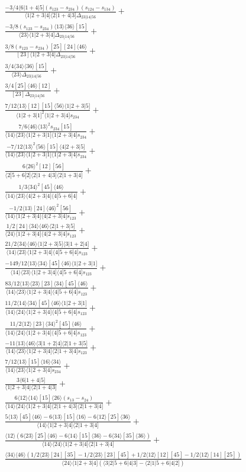 \documentclass[varwidth, border=5pt]{standalone}
\begin{document}
\begin{my}
$\begin{gathered}
\scriptscriptstyle\frac{-3/4⟨6|1+4|5](s_{123}-s_{234})(s_{124}-s_{134})}{⟨1|2+3|4]⟨2|1+4|3]Δ_{23|14|56}}+\\
\scriptscriptstyle\frac{-3/8(s_{123}-s_{234})⟨13⟩⟨36⟩[15]}{⟨23⟩⟨1|2+3|4]Δ_{23|14|56}}+\\
\scriptscriptstyle\frac{3/8(s_{123}-s_{234})[25][24]⟨46⟩}{[23]⟨1|2+3|4]Δ_{23|14|56}}+\\
\scriptscriptstyle\frac{3/4⟨34⟩⟨36⟩[15]}{⟨23⟩Δ_{23|14|56}}+\\
\scriptscriptstyle\frac{3/4[25]⟨46⟩[12]}{[23]Δ_{23|14|56}}+\\
\scriptscriptstyle\frac{7/12⟨13⟩[12][15]⟨56⟩⟨1|2+3|5]}{⟨1|2+3|1]^2⟨1|2+3|4]s_{234}}+\\
\scriptscriptstyle\frac{7/6⟨46⟩⟨13⟩^2s_{234}[15]}{⟨14⟩⟨23⟩⟨1|2+3|1]⟨1|2+3|4]s_{234}}+\\
\scriptscriptstyle\frac{-7/12⟨13⟩^2⟨56⟩[15]⟨4|2+3|5]}{⟨14⟩⟨23⟩⟨1|2+3|1]⟨1|2+3|4]s_{234}}+\\
\scriptscriptstyle\frac{6⟨26⟩^2[12][56]}{⟨2|5+6|2]⟨2|1+4|3]⟨2|1+3|4]}+\\
\scriptscriptstyle\frac{1/3⟨34⟩^2[45]⟨46⟩}{⟨14⟩⟨23⟩⟨4|2+3|4]⟨4|5+6|4]}+\\
\scriptscriptstyle\frac{-1/2⟨13⟩[24]⟨46⟩^2[56]}{⟨14⟩⟨1|2+3|4]⟨4|2+3|4]s_{123}}+\\
\scriptscriptstyle\frac{1/2[24]⟨34⟩⟨46⟩⟨2|1+3|5]}{⟨24⟩⟨1|2+3|4]⟨4|2+3|4]s_{123}}+\\
\scriptscriptstyle\frac{21/2⟨34⟩⟨46⟩⟨1|2+3|5]⟨3|1+2|4]}{⟨14⟩⟨23⟩⟨1|2+3|4]⟨4|5+6|4]s_{123}}+\\
\scriptscriptstyle\frac{-149/12⟨13⟩⟨34⟩[45]⟨46⟩⟨1|2+3|1]}{⟨14⟩⟨23⟩⟨1|2+3|4]⟨4|5+6|4]s_{123}}+\\
\scriptscriptstyle\frac{83/12⟨13⟩⟨23⟩[23]⟨34⟩[45]⟨46⟩}{⟨14⟩⟨23⟩⟨1|2+3|4]⟨4|5+6|4]s_{123}}+\\
\scriptscriptstyle\frac{11/2⟨14⟩⟨34⟩[45]⟨46⟩⟨1|2+3|1]}{⟨14⟩⟨24⟩⟨1|2+3|4]⟨4|5+6|4]s_{123}}+\\
\scriptscriptstyle\frac{11/2⟨12⟩[23]⟨34⟩^2[45]⟨46⟩}{⟨14⟩⟨24⟩⟨1|2+3|4]⟨4|5+6|4]s_{123}}+\\
\scriptscriptstyle\frac{-11⟨13⟩⟨46⟩⟨3|1+2|4]⟨2|1+3|5]}{⟨14⟩⟨23⟩⟨1|2+3|4]⟨2|1+3|4]s_{123}}+\\
\scriptscriptstyle\frac{7/12⟨13⟩[15]⟨16⟩⟨34⟩}{⟨14⟩⟨23⟩⟨1|2+3|4]s_{234}}+\\
\scriptscriptstyle\frac{3⟨6|1+4|5]}{⟨1|2+3|4]⟨2|1+4|3]}+\\
\scriptscriptstyle\frac{6⟨12⟩⟨14⟩[15]⟨26⟩(s_{13}-s_{24})}{⟨14⟩⟨24⟩⟨1|2+3|4]⟨2|1+4|3]⟨2|1+3|4]}+\\
\scriptscriptstyle\frac{5⟨13⟩[45]⟨46⟩-6⟨13⟩[15]⟨16⟩-6⟨12⟩[25]⟨36⟩}{⟨14⟩⟨1|2+3|4]⟨2|1+3|4]}+\\
\scriptscriptstyle\frac{⟨12⟩(6⟨23⟩[25]⟨46⟩-6⟨14⟩[15]⟨36⟩-6⟨34⟩[35]⟨36⟩)}{⟨14⟩⟨24⟩⟨1|2+3|4]⟨2|1+3|4]}+\\
\scriptscriptstyle\frac{⟨34⟩⟨46⟩(1/2⟨23⟩[24][35]-1/2⟨23⟩[23][45]+1/2⟨12⟩[12][45]-1/2⟨12⟩[14][25])}{⟨24⟩⟨1|2+3|4](⟨3|2|5+6|4|3]-⟨2|1|5+6|4|2])}\phantom{+}
\end{gathered}$
\end{my}
\end{document}
